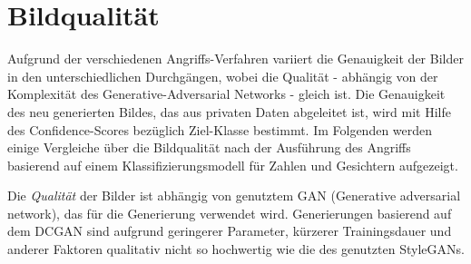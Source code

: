 \section{Bildqualität}
Aufgrund der verschiedenen Angriffs-Verfahren variiert die Genauigkeit der Bilder in den unterschiedlichen Durchgängen, wobei die Qualität - abhängig von der Komplexität des Generative-Adversarial Networks - gleich ist. Die Genauigkeit des neu generierten Bildes, das aus privaten Daten abgeleitet ist, wird mit Hilfe des Confidence-Scores bezüglich Ziel-Klasse bestimmt. Im Folgenden werden einige Vergleiche über die Bildqualität nach der Ausführung des Angriffs basierend auf einem Klassifizierungsmodell für Zahlen und Gesichtern aufgezeigt.

Die \textit{Qualität} der Bilder ist abhängig von genutztem GAN (Generative adversarial network), das für die Generierung verwendet wird. Generierungen basierend auf dem DCGAN sind aufgrund geringerer Parameter, kürzerer Trainingsdauer und anderer Faktoren qualitativ nicht so hochwertig wie die des genutzten StyleGANs.

